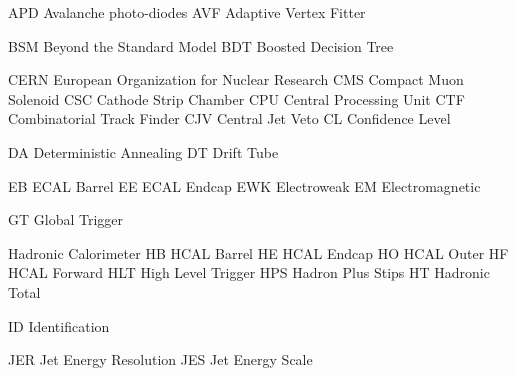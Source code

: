 
  {APD}  {Avalanche photo-diodes}
  {AVF}  {Adaptive Vertex Fitter}

 {BSM} {Beyond the Standard Model}
 {BDT} {Boosted Decision Tree}

 {CERN} {European Organization for Nuclear Research} %
  {CMS}  {Compact Muon Solenoid}
  {CSC}  {Cathode Strip Chamber}
  {CPU}  {Central Processing Unit}
  {CTF}  {Combinatorial Track Finder}
  {CJV}  {Central Jet Veto}
   {CL}   {Confidence Level}

 {DA} {Deterministic Annealing}
 {DT} {Drift Tube}

  {EB}  {ECAL Barrel}
  {EE}  {ECAL Endcap}
 {EWK} {Electroweak}
  {EM}  {Electromagnetic}


 {GT} {Global Trigger}

  {Hadronic Calorimeter}
  {HB}    {HCAL Barrel}
  {HE}    {HCAL Endcap}
  {HO}    {HCAL Outer}
  {HF}    {HCAL Forward}
 {HLT}   {High Level Trigger}
 {HPS}   {Hadron Plus Stips}
  {HT}    {Hadronic Total}

 {ID} {Identification}

 {JER} {Jet Energy Resolution}
 {JES} {Jet Energy Scale}

